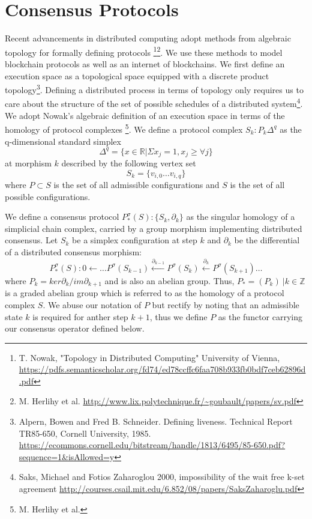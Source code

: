 \documentclass{article}
\begin{document}
\section{Consensus Protocols}
Recent advancements in distributed computing adopt methods from algebraic topology for formally defining protocols \footnote{T. Nowak, "Topology in Distributed Computing" University of Vienna, \url{https://pdfs.semanticscholar.org/fd74/ed78ccffc6faa708b933fb0bdf7ceb62896d.pdf}}\footnote{M. Herlihy et al. \url{http://www.lix.polytechnique.fr/~goubault/papers/sv.pdf}}. We use these methods to model blockchain protocols as well as an internet of blockchains. We first define an execution space as a topological space equipped with a discrete product topology\footnote{Alpern, Bowen and Fred B. Schneider. Defining liveness. Technical Report TR85-650,
Cornell University, 1985. \url{https://ecommons.cornell.edu/bitstream/handle/1813/6495/85-650.pdf?sequence=1&isAllowed=y}}. Defining a distributed process in terms of topology only requires us to care about the structure of the set of possible schedules of a distributed system\footnote{Saks, Michael and Fotios Zaharoglou 2000, impossibility of the wait free k-set agreement \url{http://courses.csail.mit.edu/6.852/08/papers/SaksZaharoglu.pdf}}. We adopt Nowak's algebraic definition of an execution space in terms of the homology of protocol complexes \footnote{M. Herlihy et al.}. We define a protocol complex $S_k: P_k{\Delta^q}$ as the q-dimensional standard simplex
\begin{equation} \label{eq1}
\Delta^q = \{x \in \mathbb{R} | \Sigma x_j = 1, x_j \geq \forall j \}
\end{equation} \label{eq1}
at morphism $k$ described by the following vertex set
\begin{equation} \label{eq1}
S_k = \{v_{i,0} \dots v_{i,q}\}
\end{equation} \label{eq1}
where $P \subset S$ is the set of all admissible configurations and $S$ is the set of all possible configurations.
 
We define a consensus protocol $P^\sigma_{*}(S):\{S_k, \partial_k\}$ as the singular homology of a simplicial chain complex, carried by a group morphism implementing distributed consensus. Let $S_k$ be a simplex configuration at step $k$ and $\partial_k$ be the differential of a distributed consensus morphism:
\begin{equation} \label{eq1}
P^\sigma_{*}(S): 0 \leftarrow \dots P^\sigma(S_{k-1})\xleftarrow {\partial_{k-1}} P^\sigma(S_{k})\xleftarrow {\partial_{k}} P^\sigma(S_{k+1}) \dots
\end{equation} \label{eq1}
where $P_k = ker \partial_k / im \partial_{k+1}$ and is also an abelian group. Thus, $P_*= (P_k) \ | k \in \mathbb{Z}$ is a graded abelian group which is referred to as the homology of a protocol complex $S$. We abuse our notation of $P$ but rectify by noting that an admissible state $k$ is required for anther step $k + 1$, thus we define $P$ as the functor carrying our consensus operator defined below.
\end{document}

